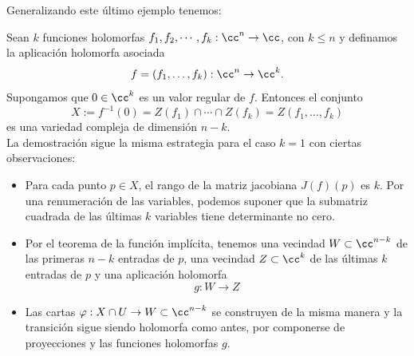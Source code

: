     Generalizando este último ejemplo tenemos:
    \begin{example}\label{interseccioncompleja}
        Sean $k$ funciones holomorfas $f_1,f_2,\cdots,f_k:\cc^n\to \cc$, con $k\leq n$ y definamos la aplicación holomorfa asociada
        \begin{equation*}
        	f=(f_1,\dots,f_k):\cc^n\to\cc^k.
        \end{equation*}   
    	Supongamos que $0\in\cc^k$ es un valor regular de $f$. Entonces el conjunto
    	\begin{equation*}
    		X:=f^{-1}(0)=Z(f_1)\cap\cdots\cap Z(f_k)=Z(f_1,\dots,f_k)
    	\end{equation*}
    	es una variedad compleja de dimensión $n-k$.\\
    	La demostración sigue la misma estrategia para el caso $k=1$ con ciertas observaciones:
    	\begin{itemize}
    		\item Para cada punto $p\in X$, el rango de la matriz jacobiana $J(f)(p)$ es $k$. Por una renumeración de las variables, podemos suponer que la submatriz cuadrada de las últimas $k$ variables tiene determinante no cero.
    		\item Por el teorema de la función implícita, tenemos una vecindad $W\subset\cc^{n-k}$ de las primeras $n-k$ entradas de $p$, una vecindad $Z\subset\cc^k$ de las últimas $k$ entradas de $p$ y una aplicación holomorfa
    		\begin{equation*}
    			g:W\to Z
    		\end{equation*}
    		\item Las cartas $\varphi:X\cap U\to W\subset\cc^{n-k}$ se construyen de la misma manera y la transición sigue siendo holomorfa como antes, por componerse de proyecciones y las funciones holomorfas $g$.
    	\end{itemize}
    	
    \end{example}

